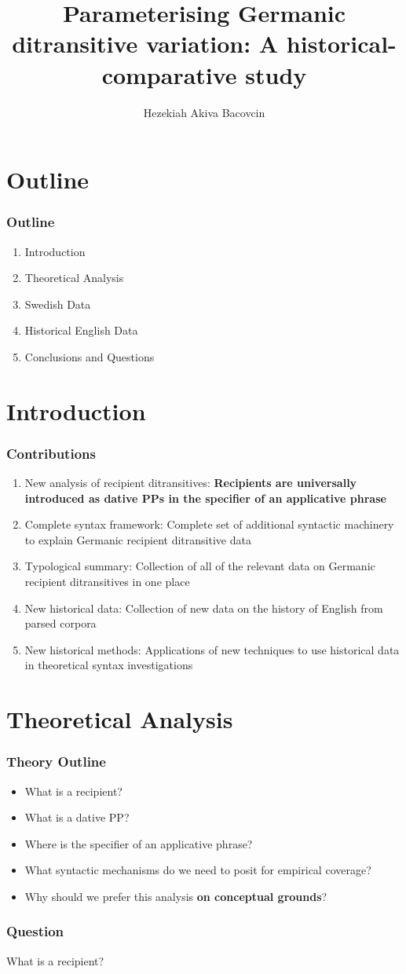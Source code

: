 \documentclass{beamer}
\title[]{\textbf{Parameterising Germanic ditransitive variation: A historical-comparative study}}
\author{Hezekiah Akiva Bacovcin}
\institute{University of Pennsylvania - Department of Linguistics}
\begin{document}
\begin{frame}
\titlepage
\end{frame}

\section{Outline}
\begin{frame}
\frametitle{Outline}
\begin{enumerate}
\item Introduction
\item Theoretical Analysis
\item Swedish Data
\item Historical English Data
\item Conclusions and Questions
\end{enumerate}
\end{frame}

\section{Introduction}
\begin{frame}
		\frametitle{Contributions}
		\begin{enumerate}
			\item New analysis of recipient ditransitives: \textbf{Recipients are universally introduced as dative PPs in the specifier of an applicative phrase}
			\item Complete syntax framework: Complete set of additional syntactic machinery to explain Germanic recipient ditransitive data
			\item Typological summary: Collection of all of the relevant data on Germanic recipient ditransitives in one place
			\item New historical data: Collection of new data on the history of English from parsed corpora
			\item New historical methods: Applications of new techniques to use historical data in theoretical syntax investigations
		\end{enumerate}
\end{frame}

\section{Theoretical Analysis}
\begin{frame}
	\frametitle{Theory Outline}
	\begin{itemize}
		\item What is a recipient?
		\item What is a dative PP?
		\item Where is the specifier of an applicative phrase?
		\item What syntactic mechanisms do we need to posit for empirical coverage?
		\item Why should we prefer this analysis \textbf{on conceptual grounds}?
	\end{itemize}
\end{frame}
\begin{frame}
	\frametitle{Question}
	\vfill
	\Large
		What is a recipient?
	\vfill
\end{frame}
\end{document}
